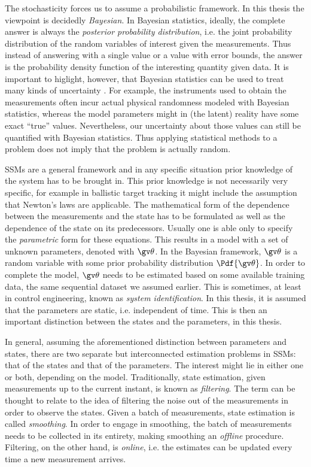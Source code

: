 The stochasticity forces us to assume a probabilistic framework. In this thesis the viewpoint
is decidedly \emph{Bayesian}. In Bayesian statistics, ideally, the complete answer
is always the \emph{posterior probability distribution}, i.e. the joint probability distribution
of the random variables of interest given the measurements. Thus instead of answering
with a single value or a value with error bounds, the answer is the probability
density function of the interesting quantity given data. It is important to higlight,
however, that Bayesian statistics can be used to treat many kinds of uncertainty
\parencite{Sarkka2012a}. For example, the instruments used to obtain the measurements often incur
actual physical randomness modeled with Bayesian statistics, whereas the model parameters 
might in (the latent) reality have some exact ``true'' values. Nevertheless, our uncertainty 
about those values can still be quantified with Bayesian statistics. Thus applying 
statistical methods to a problem does not imply that the problem is actually random.

SSMs are a general framework and in any specific situation prior knowledge of the
system has to be brought in. This prior knowledge is not necessarily very specific,
for example in ballistic target tracking it might include the assumption that Newton's
laws are applicable. The mathematical form of the dependence
between the measurements and the state has to be formulated as well as the dependence
of the state on its predecessors. Usually one is able only to specify the 
\emph{parametric} form for these equations. This results in a model with a set
of unknown parameters, denoted with $\Th$. In the Bayesian framework, $\Th$ is
a random variable with some prior probability distribution $\Pdf{\Th}$.
In order to complete the model, $\Th$ needs to be estimated based on some available
training data, the same sequential dataset we assumed earlier. This is sometimes, at least
in control engineering, known as \emph{system identification}. In this thesis,
it is assumed that the parameters are static, i.e. independent of time. 
This is then an important distinction between the states and
the parameters, in this thesis.

In general, assuming the aforementioned distinction between parameters and states, there are two separate but
interconnected estimation problems in SSMs: that of the states and that of the parameters. 
The interest might lie in either one or both, depending on the model. Traditionally, state
estimation, given measurements up to the current instant, is known as \emph{filtering}.
The term can be thought to relate to the idea of filtering the noise out of the measurements
in order to observe the states. Given a batch of measurements, state estimation is called \emph{smoothing}.
In order to engage in smoothing, the batch of measurements needs to be collected in its entirety, 
making smoothing an \emph{offline} procedure. Filtering, on the other hand, is \emph{online}, 
i.e. the estimates can be updated every time a new measurement arrives.

